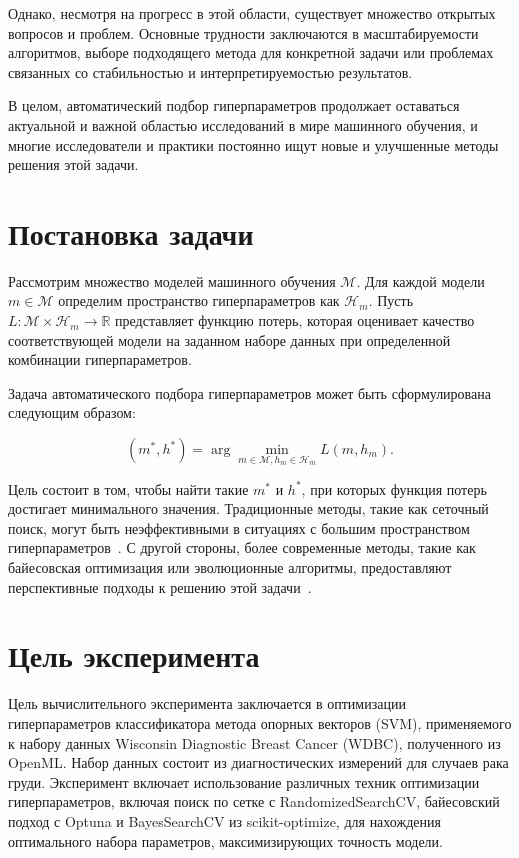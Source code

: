 \documentclass{article}
\begin{document}
Однако, несмотря на прогресс в этой области, существует множество открытых вопросов и проблем. Основные трудности заключаются в масштабируемости алгоритмов, выборе подходящего метода для конкретной задачи или проблемах связанных со стабильностью и интерпретируемостью результатов.

В целом, автоматический подбор гиперпараметров продолжает оставаться актуальной и важной областью исследований в мире машинного обучения, и многие исследователи и практики постоянно ищут новые и улучшенные методы решения этой задачи.

\section{Постановка задачи}
Рассмотрим множество моделей машинного обучения \( \mathcal{M} \). Для каждой модели \( m \in \mathcal{M} \) определим пространство гиперпараметров как \( \mathcal{H}_m \). Пусть \( L: \mathcal{M} \times \mathcal{H}_m \rightarrow \mathbb{R} \) представляет функцию потерь, которая оценивает качество соответствующей модели на заданном наборе данных при определенной комбинации гиперпараметров.

Задача автоматического подбора гиперпараметров может быть сформулирована следующим образом:

\[
(m^*, h^*) = \arg\min_{m \in \mathcal{M}, h_m \in \mathcal{H}_m} L(m, h_m).
\]

Цель состоит в том, чтобы найти такие \( m^* \) и \( h^* \), при которых функция потерь достигает минимального значения. Традиционные методы, такие как сеточный поиск, могут быть неэффективными в ситуациях с большим пространством гиперпараметров~\citep{bergstra2012}. С другой стороны, более современные методы, такие как байесовская оптимизация или эволюционные алгоритмы, предоставляют перспективные подходы к решению этой задачи~\citep{snoek2012, thornton2013}.



\section{Цель эксперимента}
Цель вычислительного эксперимента заключается в оптимизации гиперпараметров классификатора метода опорных векторов (SVM), применяемого к набору данных Wisconsin Diagnostic Breast Cancer (WDBC), полученного из OpenML. Набор данных состоит из диагностических измерений для случаев рака груди. Эксперимент включает использование различных техник оптимизации гиперпараметров, включая поиск по сетке с RandomizedSearchCV, байесовский подход с Optuna и BayesSearchCV из scikit-optimize, для нахождения оптимального набора параметров, максимизирующих точность модели.
\end{document}
